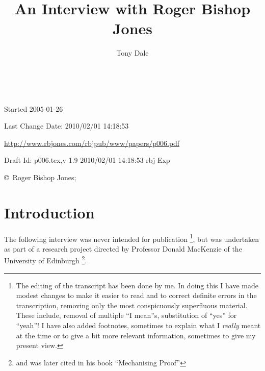 \documentclass[10pt,titlepage]{book}
\title{An Interview with Roger Bishop Jones}
\author{Tony Dale}
\date{\ }
\begin{document}
\frontmatter

\begin{titlepage}
\maketitle

\vfill



\vfill

\begin{centering}

\vfill

\footnotesize{
Started 2005-01-26

Last Change $ $Date: 2010/02/01 14:18:53 $ $

\href{http://www.rbjones.com/rbjpub/www/papers/p006.pdf}{http://www.rbjones.com/rbjpub/www/papers/p006.pdf}

Draft $ $Id: p006.tex,v 1.9 2010/02/01 14:18:53 rbj Exp $ $

\copyright\ Roger Bishop Jones;

}%
\end{centering}

\end{titlepage}

{\parskip=0pt\tableofcontents}

\mainmatter

\chapter{Introduction}
The following interview was never intended for publication%
\footnote{
The editing of the transcript has been done by me.
In doing this I have made modest changes to make it easier to read and to correct definite errors in the transcription, removing only the most conspicuously superfluous material.
These include, removal of multiple ``I mean''s, substitution of ``yes'' for ``yeah''!
I have also added footnotes, sometimes to explain what I {\it really} meant at the time or to give a bit more relevant information, sometimes to give my present view.

}, but was undertaken as part of a research project directed by Professor Donald MacKenzie of the University of Edinburgh%
\footnote{
and was later cited in his book ``Mechanising Proof''\cite{mackenzie}}.
\end{document}
